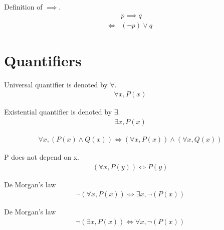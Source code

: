 \begin{defn}
\label{Definition:implies}
Definition of $\implies$.
\begin{align*}
& p \implies q \\
\iff & (\lnot p) \lor q
\end{align*}
\end{defn}

\section{Quantifiers}
\begin{defn}
Universal quantifier is denoted by $\forall$.
\begin{align*}
\forall x, P(x)
\end{align*}
\end{defn}

\begin{defn}
Existential quantifier is denoted by $\exists$.
\begin{align*}
\exists x, P(x)
\end{align*}
\end{defn}

\begin{axm}
\label{Axiom:forall_land_distributive}
\begin{align*}
\forall x, (P(x) \land Q(x)) \iff (\forall x, P(x)) \land (\forall x, Q(x))
\end{align*}
\end{axm}

\begin{axm}
\label{Axiom:forall_independent_variable}
P does not depend on x.
\begin{align*}
(\forall x, P(y)) \iff P(y)
\end{align*}
\end{axm}

\begin{axm}
\label{Axiom:De_Morgan_1}
De Morgan's law
\begin{align*}
\lnot (\forall x, P(x)) \iff \exists x, \lnot (P(x))
\end{align*}
\end{axm}

\begin{axm}
\label{Axiom:De_Morgan_2}
De Morgan's law
\begin{align*}
\lnot (\exists x, P(x)) \iff \forall x, \lnot (P(x))
\end{align*}
\end{axm}

